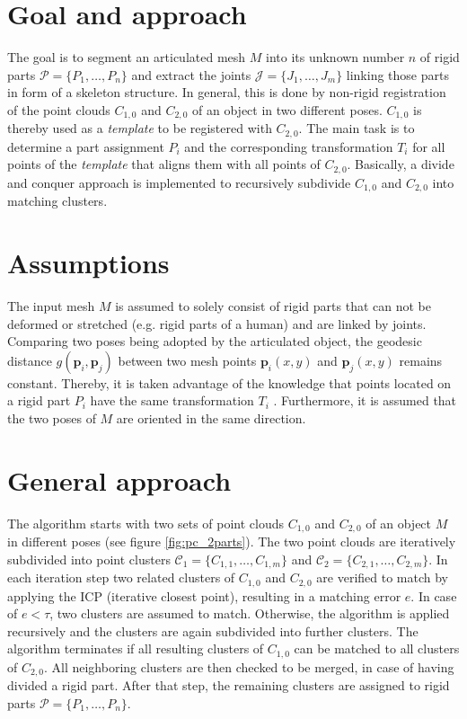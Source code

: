 \documentclass[notitlepage,english]{hgbreport}
\begin{document}
	\section{Goal and approach}
	
	The goal is to segment an articulated mesh $M$ into its unknown number $n$ of rigid parts $\mathcal{P} =  \{P_1,\ldots,P_n\}$ and extract the joints $\mathcal{J} =  \{J_1,\ldots,J_m\}$ linking those parts in form of a skeleton structure. In general, this is done by non-rigid registration of the point clouds $C_{1,0}$ and $C_{2,0}$ of an object in two different poses. $C_{1,0}$ is thereby used as a \textit{template} to be registered with $C_{2,0}$. The main task is to determine a part assignment $P_i$ and the corresponding transformation $T_i$ for all points of the \textit{template} that aligns them with all points of $C_{2,0}$. Basically, a divide and conquer approach is implemented to recursively subdivide $C_{1,0}$ and $C_{2,0}$ into matching clusters. 
	
	\section{Assumptions}
	
	The input mesh $M$ is assumed to solely consist of rigid parts that can not be deformed or stretched (e.g. rigid parts of a human) and are linked by joints. Comparing two poses being adopted by the articulated object, the geodesic distance $g(\boldsymbol{p}_i,\boldsymbol{p}_j)$ between two mesh points $\boldsymbol{p}_i(x,y)$ and $\boldsymbol{p}_j(x,y)$ remains constant. Thereby, it is taken advantage of the knowledge that points located on a rigid part $P_i$ have the same transformation $T_i$ . Furthermore, it is assumed that the two poses of $M$ are oriented in the same direction.
	
	\section{General approach}
	
	The algorithm starts with two sets of point clouds $C_{1,0}$ and $C_{2,0}$ of an object $M$ in different poses (see figure \ref{fig:pc_2parts}). The two point clouds are iteratively subdivided into point clusters $\mathcal{C}_1 =  \{C_{1,1},\ldots, C_{1,m}\}$ and $\mathcal{C}_2 =  \{C_{2,1},\ldots, C_{2,m}\}$. In each iteration step two related clusters of $C_{1,0}$ and $C_{2,0}$ are verified to match by applying the ICP (iterative closest point), resulting in a matching error $e$. In case of $ e < \tau $, two clusters are assumed to match. Otherwise, the algorithm is applied recursively and the clusters are again subdivided into further clusters. The algorithm terminates if all resulting clusters of $C_{1,0}$ can be matched to all clusters of $C_{2,0}$. All neighboring clusters are then checked to be merged, in case of having divided a rigid part. After that step, the remaining clusters are assigned to rigid parts $\mathcal{P} =  \{P_1,\ldots,P_n\}$.
	
\end{document}
